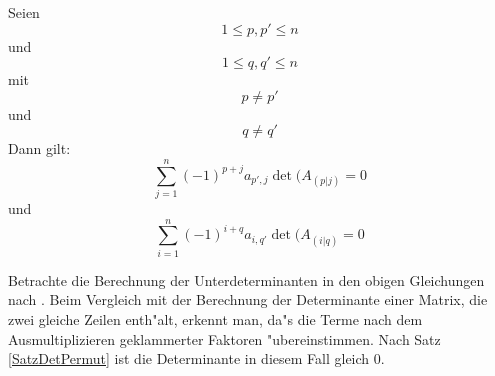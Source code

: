 \begin{lemma}
\label{SatzFalscheEntw}
    Seien \[ 1 \leq p,p' \leq n \] und \[ 1 \leq q,q' \leq n \] mit
    \[ p \neq p' \] und \[ q \neq q' \] Dann gilt:
    \[ \sum_{j=1}^n (-1)^{p+j} a_{p',j} \det(A_{(p|j)} = 0 \] und
    \[ \sum_{i=1}^n (-1)^{i+q} a_{i,q'} \det(A_{(i|q)} = 0 \]
\end{lemma}
\begin{beweis}
    Betrachte die Berechnung der Unterdeterminanten in den obigen
    Gleichungen nach . Beim
    Vergleich mit der Berechnung der Determinante einer Matrix, die
    zwei gleiche Zeilen enth"alt, erkennt man, da"s die Terme nach dem
    Ausmultiplizieren geklammerter Faktoren "ubereinstimmen. Nach Satz
    \ref{SatzDetPermut} ist die Determinante in diesem Fall gleich $0$.
\end{beweis}

